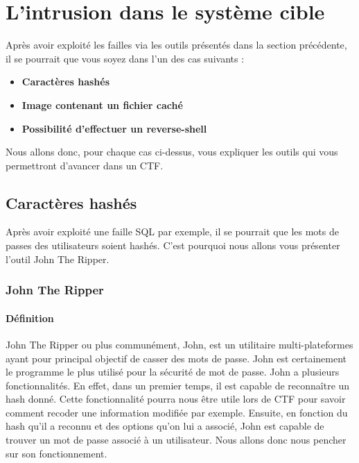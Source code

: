 \chapter{L'intrusion dans le système cible}

Après avoir exploité les failles via les outils présentés dans la section précédente, il se pourrait que vous soyez dans l'un des cas suivants :

\begin{itemize}
    \item \textbf{Caractères hashés}
    \item \textbf{Image contenant un fichier caché}
    \item \textbf{Possibilité d'effectuer un reverse-shell}
\end{itemize}

Nous allons donc, pour chaque cas ci-dessus, vous expliquer les outils qui vous permettront d'avancer dans un CTF.

\section{Caractères hashés}

Après avoir exploité une faille SQL par exemple, il se pourrait que les mots de passes des utilisateurs soient hashés. C'est pourquoi nous allons vous présenter l'outil John The Ripper.

\subsection{John The Ripper}

\subsubsection{Définition}

John The Ripper ou plus communément, John, est un utilitaire multi-plateformes ayant pour principal objectif de casser des mots de passe. John est certainement le programme le plus utilisé pour la sécurité de mot de passe.
John a plusieurs fonctionnalités. En effet, dans un premier temps, il est capable de reconnaître un hash donné. Cette fonctionnalité pourra nous être utile lors de CTF pour savoir comment recoder une information modifiée par exemple. Ensuite, en fonction du hash qu’il a reconnu et des options qu’on lui a associé, John est capable de trouver un mot de passe associé à un utilisateur.
Nous allons donc nous pencher sur son fonctionnement.

